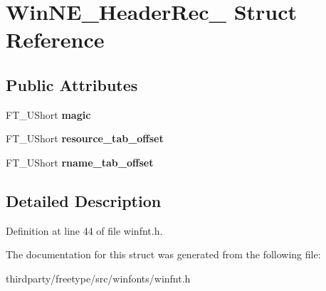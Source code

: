 \hypertarget{struct_win_n_e___header_rec__}{}\section{Win\+N\+E\+\_\+\+Header\+Rec\+\_\+ Struct Reference}
\label{struct_win_n_e___header_rec__}
\subsection*{Public Attributes}
\begin{DoxyCompactItemize}
\item 
\mbox{\label{struct_win_n_e___header_rec___af6f7f374643d72a3de09a576c627dca5}} 
F\+T\+\_\+\+U\+Short {\bfseries magic}
\item 
\mbox{\label{struct_win_n_e___header_rec___ace0518b40900890d400eb6c068ed6651}} 
F\+T\+\_\+\+U\+Short {\bfseries resource\+\_\+tab\+\_\+offset}
\item 
\mbox{\label{struct_win_n_e___header_rec___a6fadce114f8a08aa7c5cc913c99e003a}} 
F\+T\+\_\+\+U\+Short {\bfseries rname\+\_\+tab\+\_\+offset}
\end{DoxyCompactItemize}


\subsection{Detailed Description}


Definition at line 44 of file winfnt.\+h.



The documentation for this struct was generated from the following file\+:\begin{DoxyCompactItemize}
\item 
thirdparty/freetype/src/winfonts/winfnt.\+h\end{DoxyCompactItemize}
